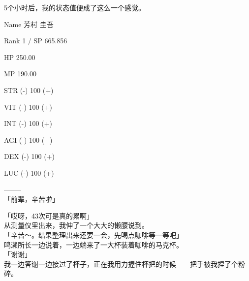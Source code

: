 5个小时后，我的状态值便成了这么一个感觉。\\

\cardline

  Name 芳村 圭吾

  Rank 1 / SP 665.856

  HP  250.00

  MP  190.00

%  
 

  STR (-) 100 (+)

  VIT (-) 100 (+)

  INT (-) 100 (+)

  AGI (-) 100 (+)

  DEX (-) 100 (+)

  LUC (-) 100 (+)

  --------\\

「前辈，辛苦啦」

「哎呀，43次可是真的累啊」\\

从测量仪里出来，我伸了一个大大的懒腰说到。\\

「辛苦～。结果整理出来还要一会，先喝点咖啡等一等吧」\\

鸣濑所长一边说着，一边端来了一大杯装着咖啡的马克杯。\\

「谢谢」\\

我一边答谢一边接过了杯子，正在我用力握住杯把的时候——把手被我捏了个粉碎。\\

